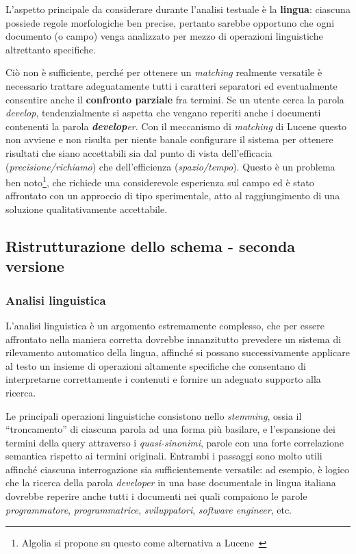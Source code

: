 \vspace{1em}

L’aspetto principale da considerare durante l’analisi testuale è la \textbf{lingua}: ciascuna possiede regole morfologiche ben precise, pertanto sarebbe opportuno che ogni documento (o campo) venga analizzato per mezzo di operazioni linguistiche altrettanto specifiche.

Ciò non è sufficiente, perché per ottenere un \textit{matching} realmente versatile è necessario trattare adeguatamente tutti i caratteri separatori ed eventualmente consentire anche il \textbf{confronto parziale} fra termini. Se un utente cerca la parola \textit{develop}, tendenzialmente si aspetta che vengano reperiti anche i documenti contenenti la parola \textit{\textbf{develop}er}. Con il meccanismo di \textit{matching} di Lucene questo non avviene e non risulta per niente banale configurare il sistema per ottenere risultati che siano accettabili sia dal punto di vista dell’efficacia (\textit{precisione/richiamo}) che dell’efficienza (\textit{spazio/tempo}).
\newline Questo è un problema ben noto\footnote{Algolia si propone su questo come alternativa a Lucene~\cite{partialmatchingangolia}}, che richiede una considerevole esperienza sul campo ed è stato affrontato con un approccio di tipo sperimentale, atto al raggiungimento di una soluzione qualitativamente accettabile.



\subsection{Ristrutturazione dello schema - seconda versione}

\subsubsection{Analisi linguistica}

L’analisi linguistica è un argomento estremamente complesso, che per essere affrontato nella maniera corretta dovrebbe innanzitutto prevedere un sistema di rilevamento automatico della lingua, affinché si possano successivamente applicare al testo un insieme di operazioni altamente specifiche che consentano di interpretarne correttamente i contenuti e fornire un adeguato supporto alla ricerca.

Le principali operazioni linguistiche consistono nello \textit{stemming}, ossia il “troncamento” di ciascuna parola ad una forma più basilare, e l’espansione dei termini della query attraverso i \textit{quasi-sinonimi}, parole con una forte correlazione semantica rispetto ai termini originali. Entrambi i passaggi sono molto utili affinché ciascuna interrogazione sia sufficientemente versatile: ad esempio, è logico che la ricerca della parola \textit{developer} in una base documentale in lingua italiana dovrebbe reperire anche tutti i documenti nei quali compaiono le parole \textit{programmatore}, \textit{programmatrice}, \textit{sviluppatori}, \textit{software engineer}, etc.

